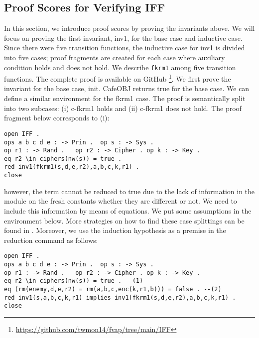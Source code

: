 \documentclass[a4paper,fleqn]{cas-dc}
\begin{document}
\subsection{Proof Scores for Verifying IFF} \label{pscores}
In this section, we introduce proof scores by proving the invariants above. We will focus on proving the first invariant, inv1, for the base case and inductive case. Since there were five transition functions, the inductive case for inv1 is divided into five cases; proof fragments are created for each case where auxiliary condition holds and does not hold. We describe \verb!fkrm1! among five transition functions. The complete proof is available on GitHub \footnote{\url{https://github.com/twmon14/fvap/tree/main/IFF}}. We first prove the invariant for the base case, init. 
CafeOBJ returns true for the base case. We can define a similar environment for the fkrm1 case. The proof is semantically split into two subcases: (i) c-fkrm1 holds and (ii) c-fkrm1 does not hold. The proof fragment below corresponds to (i): 
\begin{verbatim}
open IFF .
ops a b c d e : -> Prin .  op s : -> Sys .    
op r1 : -> Rand .   op r2 : -> Cipher . op k : -> Key .
eq r2 \in ciphers(nw(s)) = true .
red inv1(fkrm1(s,d,e,r2),a,b,c,k,r1) .
close
\end{verbatim}
however, the term cannot be reduced to true due to the lack of information in the module on the fresh constants whether they are different or not. We need to include this information by means of equations. We put some assumptions in the environment below. More strategies on how to find these case splittings can be found in \cite{OgataF03fmoods, Ogata2006, nakano2003}. Moreover, we use the induction hypothesis as a premise in the reduction command as follows:
\begin{small}
\begin{verbatim}
open IFF .
ops a b c d e : -> Prin .  op s : -> Sys .    
op r1 : -> Rand .   op r2 : -> Cipher . op k : -> Key .
eq r2 \in ciphers(nw(s)) = true . --(1)
eq (rm(enemy,d,e,r2) = rm(a,b,c,enc(k,r1,b))) = false . --(2)
red inv1(s,a,b,c,k,r1) implies inv1(fkrm1(s,d,e,r2),a,b,c,k,r1) .
close
\end{verbatim}
\end{small}
\end{document}
